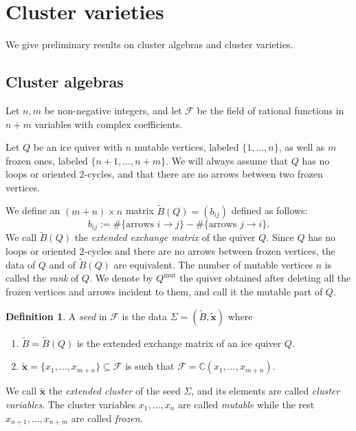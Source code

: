 \documentclass{amsart}
\newcommand{\seed}{\Sigma}
\newcommand{\excluster}[1]{\widetilde{\mathbf{#1}}}
\newcommand{\mut}{\mathrm{mut}}
\newcommand{\exmatrix}[1]{\widetilde{#1}}
\newcommand{\C}{\mathbb{C}}
\numberwithin{equation}{section}
\theoremstyle{definition}
\newtheorem{definition}[theorem]{Definition}
\newcommand{\ambient}{\mathcal{F}}
\begin{document}
\section{Cluster varieties} \label{sec:cluster-varieties} 

We give preliminary results on cluster algebras and cluster varieties. 

\subsection{Cluster algebras} Let $n, m$ be non-negative integers, and let $\ambient$ be the field of rational functions in $n+m$ variables with complex coefficients.

Let $Q$ be an ice quiver with $n$ mutable vertices, labeled $\{1, \dots, n\}$, as well as $m$ frozen ones, labeled $\{n+1, \dots, n+m\}$. We will always assume that $Q$ has no loops or oriented $2$-cycles, and that there are no arrows between two frozen vertices.

We define an $(m+n)\times n$ matrix $\exmatrix{B}(Q) = (b_{ij})$ defined as follows:
\[
b_{ij} := \#\{\text{arrows $i \to j$}\} - \#\{\text{arrows $j \to i$}\}.
\]
We call $\exmatrix{B}(Q)$ the \emph{extended exchange matrix} of the quiver $Q$. Since $Q$ has no loops or oriented $2$-cycles and there are no arrows between frozen vertices, the data of $Q$ and of $\exmatrix{B}(Q)$ are equivalent. 
The number of mutable vertices $n$ is called the \emph{rank} of $Q$. We denote by $Q^{\mut}$ the quiver obtained after deleting all the frozen vertices and arrows incident to them, and call it the mutable part of $Q$. 

\begin{definition}
    A \emph{seed} in $\ambient$ is the data $\seed = (\exmatrix{B}, \excluster{x})$ where
    \begin{enumerate}
        \item $\exmatrix{B} = \exmatrix{B}(Q)$ is the extended exchange matrix of an ice quiver $Q$.
        \item $\excluster{x} = \{x_1, \dots, x_{m+n}\} \subseteq \ambient$ is such that $\ambient = \C(x_1, \dots, x_{m+n})$. 
    \end{enumerate}
    We call $\excluster{x}$ the \emph{extended cluster} of the seed $\seed$, and its elements are called \emph{cluster variables}. The cluster variables $x_1, \dots, x_n$ are called \emph{mutable} while the rest $x_{n+1}, \dots, x_{n+m}$ are called \emph{frozen}. 
\end{definition}
\end{document}
